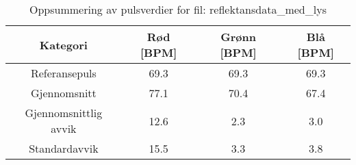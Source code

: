 
\begin{table}[H]
\centering
\caption{Oppsummering av pulsverdier for fil: reflektansdata\_med\_lys}
\label{tab:reflektansdata\_med\_lys\_summary}
\begin{tabular}{|c|c|c|c|}
\hline
\textbf{Kategori} & \textbf{Rød [BPM]} & \textbf{Grønn [BPM]} & \textbf{Blå [BPM]} \\ \hline
Referansepuls & 69.3 & 69.3 & 69.3 \\ \hline
Gjennomsnitt & 77.1 & 70.4 & 67.4 \\ \hline
Gjennomsnittlig avvik & 12.6 & 2.3 & 3.0 \\ \hline
Standardavvik & 15.5 & 3.3 & 3.8 \\ \hline
\end{tabular}
\end{table}
